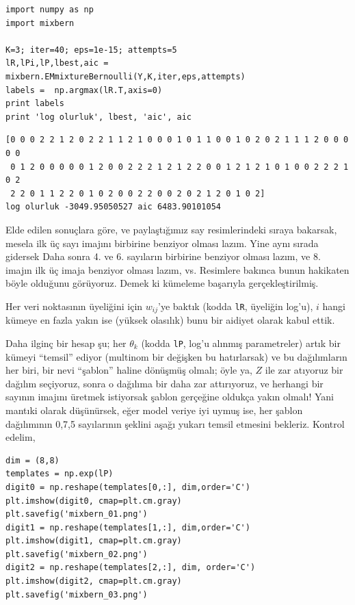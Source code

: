 \documentclass[12pt,fleqn]{article}\usepackage{../../common}
\begin{document}
\begin{verbatim}
import numpy as np
import mixbern

K=3; iter=40; eps=1e-15; attempts=5
lR,lPi,lP,lbest,aic = mixbern.EMmixtureBernoulli(Y,K,iter,eps,attempts)
labels =  np.argmax(lR.T,axis=0)
print labels
print 'log olurluk', lbest, 'aic', aic
\end{verbatim}

\begin{verbatim}
[0 0 0 2 2 1 2 0 2 2 1 1 2 1 0 0 0 1 0 1 1 0 0 1 0 2 0 2 1 1 1 2 0 0 0 0 0
 0 1 2 0 0 0 0 0 1 2 0 0 2 2 2 1 2 1 2 2 0 0 1 2 1 2 1 0 1 0 0 2 2 2 1 0 2
 2 2 0 1 1 2 2 0 1 0 2 0 0 2 2 0 0 2 0 2 1 2 0 1 0 2]
log olurluk -3049.95050527 aic 6483.90101054
\end{verbatim}

Elde edilen sonuçlara göre, ve paylaştığımız say resimlerindeki sıraya bakarsak,
mesela ilk üç sayı imajını birbirine benziyor olması lazım.  Yine aynı sırada
gidersek Daha sonra 4. ve 6. sayıların birbirine benziyor olması lazım, ve
8. imajın ilk üç imaja benziyor olması lazım, vs. Resimlere bakınca bunun
hakikaten böyle olduğunu görüyoruz. Demek ki kümeleme başarıyla
gerçekleştirilmiş.

Her veri noktasının üyeliğini için $w_{ij}$'ye baktık (kodda \verb!lR!, üyeliğin
log'u), $i$ hangi kümeye en fazla yakın ise (yüksek olasılık) bunu bir aidiyet
olarak kabul ettik.

Daha ilginç bir hesap şu; her $\theta_k$ (kodda \verb!lP!, log'u alınmış
parametreler) artık bir kümeyi ``temsil'' ediyor (multinom bir değişken bu
hatırlarsak) ve bu dağılımların her biri, bir nevi ``şablon'' haline dönüşmüş
olmalı; öyle ya, $Z$ ile zar atıyoruz bir dağılım seçiyoruz, sonra o dağılıma
bir daha zar attırıyoruz, ve herhangi bir sayının imajını üretmek istiyorsak
şablon gerçeğine oldukça yakın olmalı! Yani mantıki olarak düşünürsek, eğer
model veriye iyi uymuş ise, her şablon dağılımının 0,7,5 sayılarının şeklini
aşağı yukarı temsil etmesini bekleriz. Kontrol edelim,

\begin{verbatim}
dim = (8,8)
templates = np.exp(lP)
digit0 = np.reshape(templates[0,:], dim,order='C')
plt.imshow(digit0, cmap=plt.cm.gray)
plt.savefig('mixbern_01.png')
digit1 = np.reshape(templates[1,:], dim,order='C')
plt.imshow(digit1, cmap=plt.cm.gray)
plt.savefig('mixbern_02.png')
digit2 = np.reshape(templates[2,:], dim, order='C')
plt.imshow(digit2, cmap=plt.cm.gray)
plt.savefig('mixbern_03.png')
\end{verbatim}
\end{document}
